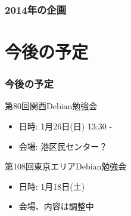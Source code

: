 \documentclass[cjk,dvipdfmx,10pt,compress,%
hyperref={bookmarks=true,bookmarksnumbered=true,bookmarksopen=false,%
colorlinks=false,%
pdftitle={第 79 回 関西 Debian 勉強会},%
pdfauthor={倉敷・のがた・佐々木・かわだ・八津尾},%
pdfsubject={資料},%
}]{beamer}
\begin{document}

\begin{frame}
  \frametitle{2014年の企画}
\end{frame}



\section{今後の予定}
\begin{frame}[fragile]
\frametitle{今後の予定}

\begin{block}{第80回関西Debian勉強会}
  \begin{itemize}
  \item 日時: 1月26日(日) 13:30 -
  \item 会場: 港区民センター？
  \end{itemize}
\end{block}

\begin{block}{第108回東京エリアDebian勉強会}
  \begin{itemize}
  \item 日時: 1月18日(土)
  \item 会場、内容は調整中
  \end{itemize}
\end{block}

\end{frame}

\takahashi[50]{  }
\end{document}
